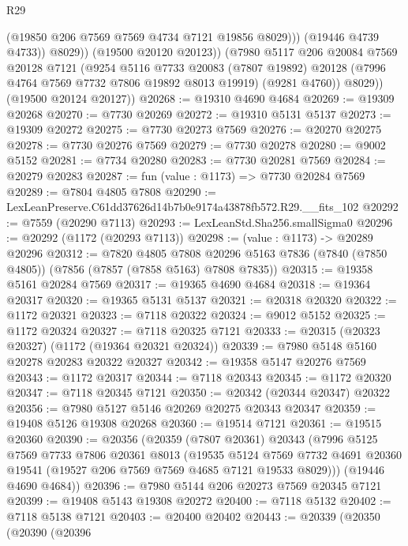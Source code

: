 \begin{lexlean}{R29}
\begin{coremodule}
                    (@19850 @206 @7569 @7569 @4734 @7121 @19856 @8029)))
                (@19446 @4739 @4733))
              @8029))
          (@19500 @20120 @20123))
        (@7980
          @5117
          @206
          @20084
          @7569
          @20128
          @7121
          (@9254
            @5116
            @7733
            @20083
            (@7807 @19892)
            @20128
            (@7996 @4764 @7569 @7732 @7806 @19892 @8013 @19919)
            (@9281 @4760))
          @8029))
      (@19500 @20124 @20127))
@20268 := @19310 @4690 @4684
@20269 := @19309 @20268
@20270 := @7730 @20269
@20272 := @19310 @5131 @5137
@20273 := @19309 @20272
@20275 := @7730 @20273 @7569
@20276 := @20270 @20275
@20278 := @7730 @20276 @7569
@20279 := @7730 @20278
@20280 := @9002 @5152
@20281 := @7734 @20280
@20283 := @7730 @20281 @7569
@20284 := @20279 @20283
@20287 := fun (value : @1173) => @7730 @20284 @7569
@20289 := @7804 @4805 @7808
@20290 := LexLeanPreserve.C61dd37626d14b7b0e9174a43878fb572.R29.__fits_102
@20292 := @7559 (@20290 @7113)
@20293 := LexLeanStd.Sha256.smallSigma0
@20296 := @20292 (@1172 (@20293 @7113))
@20298 := (value : @1173) -> @20289 @20296
@20312 := @7820
    @4805
    @7808
    @20296
    @5163
    @7836
    (@7840 (@7850 @4805))
    (@7856 (@7857 (@7858 @5163) @7808 @7835))
@20315 := @19358 @5161 @20284 @7569
@20317 := @19365 @4690 @4684
@20318 := @19364 @20317
@20320 := @19365 @5131 @5137
@20321 := @20318 @20320
@20322 := @1172 @20321
@20323 := @7118 @20322
@20324 := @9012 @5152
@20325 := @1172 @20324
@20327 := @7118 @20325 @7121
@20333 := @20315 (@20323 @20327) (@1172 (@19364 @20321 @20324))
@20339 := @7980 @5148 @5160 @20278 @20283 @20322 @20327
@20342 := @19358 @5147 @20276 @7569
@20343 := @1172 @20317
@20344 := @7118 @20343
@20345 := @1172 @20320
@20347 := @7118 @20345 @7121
@20350 := @20342 (@20344 @20347) @20322
@20356 := @7980 @5127 @5146 @20269 @20275 @20343 @20347
@20359 := @19408 @5126 @19308 @20268
@20360 := @19514 @7121
@20361 := @19515 @20360
@20390 := @20356
    (@20359
      (@7807 @20361)
      @20343
      (@7996
        @5125
        @7569
        @7733
        @7806
        @20361
        @8013
        (@19535
          @5124
          @7569
          @7732
          @4691
          @20360
          @19541
          (@19527 @206 @7569 @7569 @4685 @7121 @19533 @8029)))
      (@19446 @4690 @4684))
@20396 := @7980 @5144 @206 @20273 @7569 @20345 @7121
@20399 := @19408 @5143 @19308 @20272
@20400 := @7118 @5132
@20402 := @7118 @5138 @7121
@20403 := @20400 @20402
@20443 := @20339
    (@20350
      (@20390
        (@20396

\end{coremodule}
\end{lexlean}
